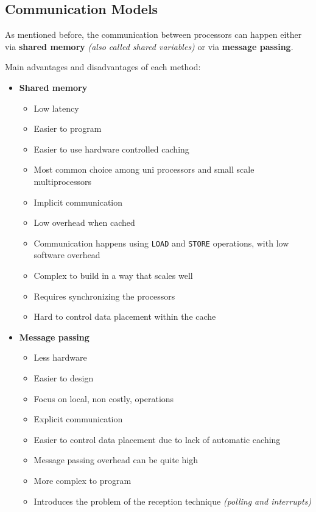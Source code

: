 \documentclass[english]{article}
\begin{document}
\subsection{Communication Models}

As mentioned before, the communication between processors can happen either via \textbf{shared memory} \textit{(also called shared variables)} or via \textbf{message passing}.

Main advantages and disadvantages of each method:

\begin{itemize}
  \item \textbf{Shared memory}
        \begin{itemize}[label=\cmark]
          \item Low latency
          \item Easier to program
          \item Easier to use hardware controlled caching
          \item Most common choice among uni processors and small scale multiprocessors
          \item Implicit communication
          \item Low overhead when cached
          \item Communication happens using \texttt{LOAD} and \texttt{STORE} operations, with low software overhead
        \end{itemize}
        \begin{itemize}[label=\xmark]
          \item Complex to build in a way that scales well
          \item Requires synchronizing the processors
          \item Hard to control data placement within the cache
        \end{itemize}
  \item \textbf{Message passing}
        \begin{itemize}[label=\cmark]
          \item Less hardware
          \item Easier to design
          \item Focus on local, non costly, operations
          \item Explicit communication
          \item Easier to control data placement due to lack of automatic caching
        \end{itemize}
        \begin{itemize}[label=\xmark]
          \item Message passing overhead can be quite high
          \item More complex to program
          \item Introduces the problem of the reception technique \textit{(polling and interrupts)}
        \end{itemize}
\end{itemize}
\end{document}
